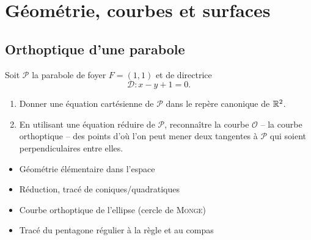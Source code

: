 \chapter{Géométrie, courbes et surfaces}

\section{Orthoptique d'une parabole}

\begin{exercice}
    Soit $\mathscr{P}$ la parabole de foyer $F = (1, 1)$ et de directrice
    $$\mathscr{D}: x-y+1 = 0.$$
    \begin{enumerate}
        \item Donner une équation cartésienne de $\mathscr{P}$ dans le repère canonique de $\mathbb{R}^2$.
        \item En utilisant une équation réduire de $\mathscr{P}$, reconnaître la courbe $\mathscr{O}$ -- la courbe orthoptique -- des points d'où l'on peut mener deux tangentes à $\mathscr{P}$ qui soient perpendiculaires entre elles.
    \end{enumerate}
\end{exercice}  

\begin{itemize}
    \item Géométrie élémentaire dans l'espace
    \item Réduction, tracé de coniques/quadratiques
    \item Courbe orthoptique de l'ellipse (cercle de \textsc{Monge})
    \item Tracé du pentagone régulier à la règle et au compas
\end{itemize}